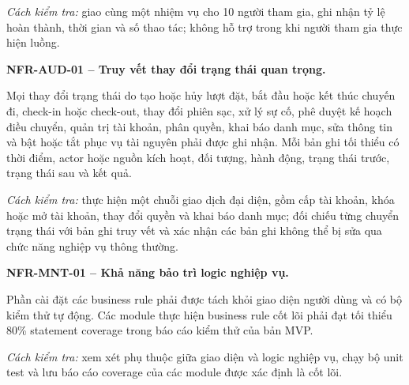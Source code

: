 \textit{Cách kiểm tra:} giao cùng một nhiệm vụ cho 10 người tham gia, ghi nhận tỷ lệ hoàn thành, thời gian và số thao tác; không hỗ trợ trong khi người tham gia thực hiện luồng.

\medskip
\noindent\textbf{NFR-AUD-01 -- Truy vết thay đổi trạng thái quan trọng.}\par
\nopagebreak[4]
Mọi thay đổi trạng thái do tạo hoặc hủy lượt đặt, bắt đầu hoặc kết thúc chuyến đi, check-in hoặc check-out, thay đổi phiên sạc, xử lý sự cố, phê duyệt kế hoạch điều chuyển, quản trị tài khoản, phân quyền, khai báo danh mục, sửa thông tin và bật hoặc tắt phục vụ tài nguyên phải được ghi nhận. Mỗi bản ghi tối thiểu có thời điểm, actor hoặc nguồn kích hoạt, đối tượng, hành động, trạng thái trước, trạng thái sau và kết quả.

\textit{Cách kiểm tra:} thực hiện một chuỗi giao dịch đại diện, gồm cấp tài khoản, khóa hoặc mở tài khoản, thay đổi quyền và khai báo danh mục; đối chiếu từng chuyển trạng thái với bản ghi truy vết và xác nhận các bản ghi không thể bị sửa qua chức năng nghiệp vụ thông thường.

\medskip
\noindent\textbf{NFR-MNT-01 -- Khả năng bảo trì logic nghiệp vụ.}\par
\nopagebreak[4]
Phần cài đặt các business rule phải được tách khỏi giao diện người dùng và có bộ kiểm thử tự động. Các module thực hiện business rule cốt lõi phải đạt tối thiểu 80\% statement coverage trong báo cáo kiểm thử của bản MVP.

\textit{Cách kiểm tra:} xem xét phụ thuộc giữa giao diện và logic nghiệp vụ, chạy bộ unit test và lưu báo cáo coverage của các module được xác định là cốt lõi.
